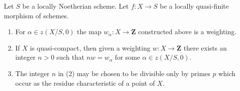 \begin{lemma}
\label{lemma-weightings}
Let $S$ be a locally Noetherian scheme. Let $f : X \to S$ be a locally
quasi-finite morphism of schemes.
\begin{enumerate}
\item For $\alpha \in z(X/S, 0)$ the map $w_\alpha : X \to \mathbf{Z}$
constructed above is a weighting.
\item If $X$ is quasi-compact, then given a weighting
$w : X \to \mathbf{Z}$ there exists an integer $n > 0$ such
that $nw = w_\alpha$ for some $\alpha \in z(X/S, 0)$.
\item The integer $n$ in (2) may be chosen to be divisible
only by primes $p$ which occur as the residue characteristic
of a point of $X$.
\end{enumerate}
\end{lemma}


